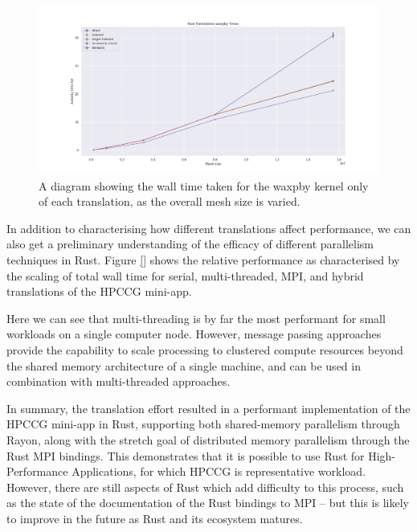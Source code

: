 \begin{figure}[H]
    \centering
    \includegraphics[width=\textwidth]{images/3_translation/translations_waxpby_line.png}
    \caption{A diagram showing the wall time taken for the waxpby kernel only of each translation, as the overall mesh size is varied.}
    \label{fig:translations_waxpby_line}
\end{figure}


In addition to characterising how different translations affect performance, we can also get a preliminary understanding of the efficacy of different parallelism techniques in Rust. Figure \ref{} shows the relative performance as characterised by the scaling of total wall time for serial, multi-threaded, MPI, and hybrid translations of the HPCCG mini-app.


Here we can see that multi-threading is by far the most performant for small workloads on a single computer node. However, message passing approaches provide the capability to scale processing to clustered compute resources beyond the shared memory architecture of a single machine, and can be used in combination with multi-threaded approaches.

In summary, the translation effort resulted in a performant implementation of the HPCCG mini-app in Rust, supporting both shared-memory parallelism through Rayon, along with the stretch goal of distributed memory parallelism through the Rust MPI bindings. This demonstrates that it is possible to use Rust for High-Performance Applications, for which HPCCG is representative workload. However, there are still aspects of Rust which add difficulty to this process, such as the state of the documentation of the Rust bindings to MPI -- but this is likely to improve in the future as Rust and its ecosystem matures.



